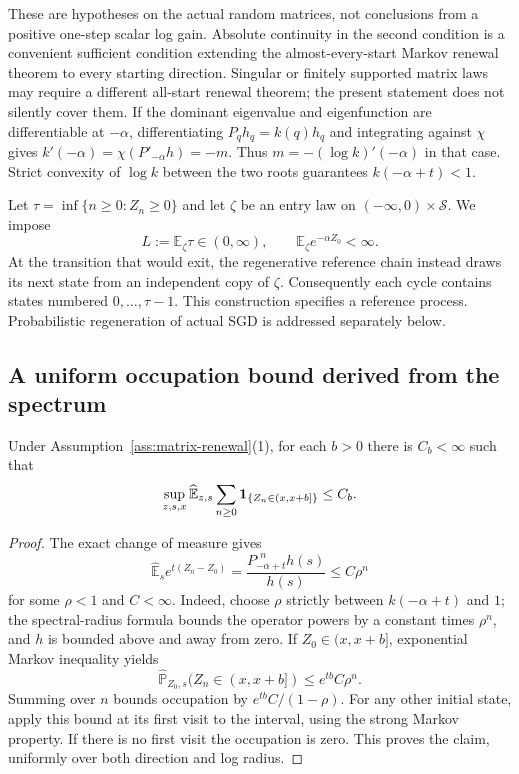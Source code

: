 These are hypotheses on the actual random matrices, not conclusions
from a positive one-step scalar log gain. Absolute continuity in the
second condition is a convenient sufficient condition extending the
almost-every-start Markov renewal theorem to every starting direction.
Singular or finitely supported matrix laws may require a different
all-start renewal theorem; the present statement does not silently
cover them. If the dominant eigenvalue and eigenfunction are
differentiable at $-\alpha$, differentiating $P_qh_q=k(q)h_q$ and
integrating against $\chi$ gives
$k'(-\alpha)=\chi(P'_{-\alpha}h)=-m$.
Thus $m=-(\log k)'(-\alpha)$ in that case. Strict convexity of
$\log k$ between the two roots guarantees $k(-\alpha+t)<1$.

Let $\tau=\inf\{n\ge0:Z_n\ge0\}$ and let $\zeta$ be an entry law on
$(-\infty,0)\times\mathcal S$. We impose
\begin{equation}
 L:=\mathbb E_\zeta\tau\in(0,\infty),\qquad
 \mathbb E_\zeta e^{-\alpha Z_0}<\infty.
 \label{eq:matrix-entry}
\end{equation}
At the transition that would exit, the regenerative reference chain
instead draws its next state from an independent copy of $\zeta$.
Consequently each cycle contains states numbered $0,\ldots,\tau-1$.
This construction specifies a reference process. Probabilistic
regeneration of actual SGD is addressed separately below.

\subsection{A uniform occupation bound derived from the spectrum}
\begin{lemma}
\label{lem:matrix-potential-bound}
Under Assumption~\ref{ass:matrix-renewal}(1), for each $b>0$ there is
$C_b<\infty$ such that
\begin{equation}
 \sup_{z,s,x}\widehat{\mathbb E}_{z,s}
 \sum_{n\ge0}{\bf1}_{\{Z_n\in(x,x+b]\}}\le C_b.
 \label{eq:uniform-renewal-bound}
\end{equation}
\end{lemma}
\begin{proof}
The exact change of measure gives
\begin{equation}
 \widehat{\mathbb E}_s
 e^{t(Z_n-Z_0)}
 =\frac{P_{-\alpha+t}^{,n}h(s)}{h(s)}
 \le C\rho^n
 \label{eq:tilted-exp-contraction}
\end{equation}
for some $\rho<1$ and $C<\infty$.
Indeed, choose $\rho$ strictly between $k(-\alpha+t)$ and $1$;
the spectral-radius formula bounds the operator powers by a constant
times $\rho^n$, and $h$ is bounded above and away from zero.
If $Z_0\in(x,x+b]$, exponential Markov inequality yields
\[
 \widehat{\mathbb P}_{Z_0,s}(Z_n\in(x,x+b])
 \le e^{tb}C\rho^n.
\]
Summing over $n$ bounds occupation by $e^{tb}C/(1-\rho)$.
For any other initial state, apply this bound at its first visit to
the interval, using the strong Markov property. If there is no first
visit the occupation is zero. This proves the claim, uniformly over
both direction and log radius.
\end{proof}

